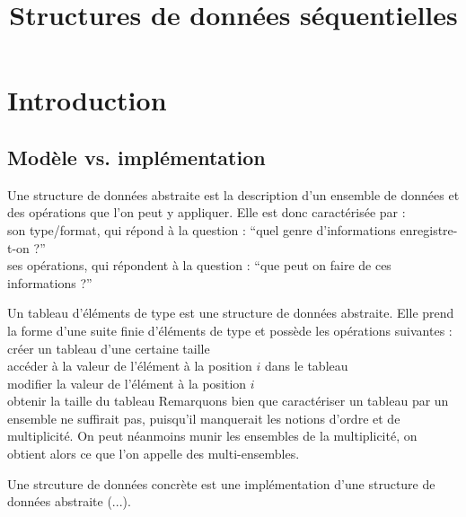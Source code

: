 


	
\title{Structures de données séquentielles}

\section{Introduction}
	
	\subsection{Modèle vs. implémentation}
	
		\begin{Definition}
			Une structure de données abstraite est la description d'un ensemble de données et des opérations que l'on peut y appliquer. \nt
			Elle est donc caractérisée par : \\
				 \bdot son type/format, qui répond à la question : ``quel genre d'informations enregistre-t-on ?'' \\
				 \bdot ses opérations, qui répondent à la question : ``que peut on faire de ces informations ?''
		\end{Definition}
		
		\begin{Exemple}
			Un tableau d'éléments de type  est une structure de données abstraite. Elle prend la forme d'une suite finie d'éléments de type  et possède les opérations suivantes : \\
				 \bdot créer un tableau d'une certaine taille \\
				 \bdot accéder à la valeur de l'élément à la position \(i\) dans le tableau \\
				 \bdot modifier la valeur de l'élément à la position \(i\) \\
				 \bdot obtenir la taille du tableau \nt
			Remarquons bien que caractériser un tableau par un ensemble ne suffirait pas, puisqu'il manquerait les notions d'ordre et de multiplicité. On peut néanmoins munir les ensembles de la multiplicité, on obtient alors ce que l'on appelle des multi-ensembles.
		\end{Exemple}
	
		\begin{Definition}
			Une strcuture de données concrète est une implémentation d'une structure de données abstraite (...).
		\end{Definition}
		
